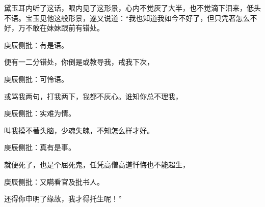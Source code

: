 \begin{parag}
    黛玉耳内听了这话，眼内见了这形景，心内不觉灰了大半，也不觉滴下泪来，低头不语。宝玉见他这般形景，遂又说道：“我也知道我如今不好了，但只凭著怎么不好，万不敢在妹妹跟前有错处。\begin{note}庚辰侧批：有是语。\end{note}便有一二分错处，你倒是或教导我，戒我下次，\begin{note}庚辰侧批：可怜语。\end{note}或骂我两句，打我两下，我都不灰心。谁知你总不理我，\begin{note}庚辰侧批：实难为情。\end{note}叫我摸不著头脑，少魂失魄，不知怎么样才好。\begin{note}庚辰侧批：真有是事。\end{note}就便死了，也是个屈死鬼，任凭高僧高道忏悔也不能超生，\begin{note}庚辰侧批：又瞒看官及批书人。\end{note}还得你申明了缘故，我才得托生呢！”
\end{parag}


